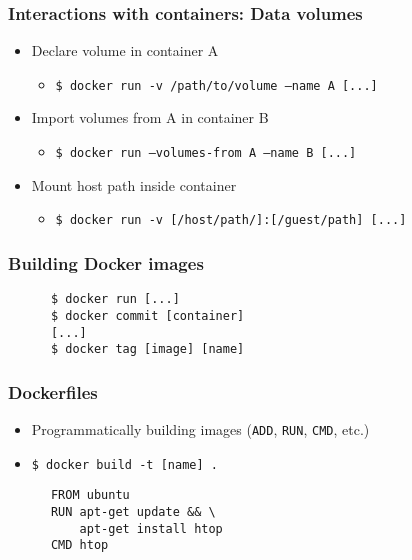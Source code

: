 \documentclass[xetex,mathserif,serif]{beamer}
\begin{document}
  \begin{frame}
    \frametitle{Interactions with containers: Data volumes}
    \begin{itemize}
      \item Declare volume in container A
        \begin{itemize}
          \item \texttt{\$ docker run -v /path/to/volume --name A [...]}
        \end{itemize}
      \item Import volumes from A in container B
        \begin{itemize}
          \item \texttt{\$ docker run --volumes-from A --name B [...]}
        \end{itemize}
      \item Mount host path inside container
        \begin{itemize}
          \item \texttt{\$ docker run -v [/host/path/]:[/guest/path] [...]}
        \end{itemize}
    \end{itemize}
  \end{frame}
  \begin{frame}[fragile=singleslide]
    \frametitle{Building Docker images}
    \begin{verbatim}
      $ docker run [...]
      $ docker commit [container]
      [...]
      $ docker tag [image] [name]
    \end{verbatim}
  \end{frame}
  \begin{frame}[fragile=singleslide]
    \frametitle{Dockerfiles}
    \begin{itemize}
      \item Programmatically building images (\texttt{ADD}, \texttt{RUN}, \texttt{CMD}, etc.)
      \item \texttt{\$ docker build -t [name] .}
    \end{itemize}
    \begin{verbatim}
      FROM ubuntu
      RUN apt-get update && \
          apt-get install htop
      CMD htop
    \end{verbatim}
  \end{frame}
\end{document}
